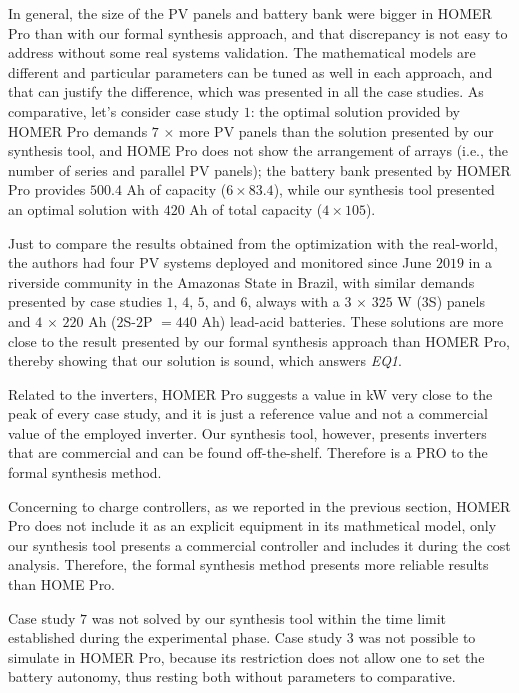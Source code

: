 \documentclass[review]{elsarticle}
\begin{document}
In general, the size of the PV panels and battery bank were 
bigger in HOMER Pro than with our formal synthesis approach, 
and that discrepancy is not easy to address without some real 
systems validation. The mathematical models are different and 
particular parameters can be tuned as well in each approach, 
and that can justify the difference, which was presented in all 
the case studies. As comparative, let's consider case study $1$: 
the optimal solution provided by HOMER Pro demands $7$ $\times$ 
more PV panels than the solution presented by our synthesis tool, 
and HOME Pro does not show the arrangement of arrays 
(i.e., the number of series and parallel PV panels); 
the battery bank presented by HOMER Pro provides $500.4$ Ah 
of capacity ($6 \times 83.4$), while our synthesis tool 
presented an optimal solution with $420$ Ah of total capacity 
($4 \times 105$). 

Just to compare the results obtained from the optimization 
with the real-world, the authors had four PV systems deployed 
and monitored since June $2019$ in a riverside community 
in the Amazonas State in Brazil, with similar demands 
presented by case studies $1$, $4$, $5$, and $6$, 
always with a $3$ $\times$ $325$ W ($3$S) panels and 
$4$ $\times$ $220$ Ah ($2$S-$2$P $= 440$ Ah) 
lead-acid batteries. These solutions are more close 
to the result presented by our formal synthesis 
approach than HOMER Pro, thereby showing that our 
solution is sound, which answers \textit{EQ1}.

Related to the inverters, HOMER Pro suggests a value in 
kW very close to the peak of every case study, and it 
is just a reference value and not a commercial value of 
the employed inverter. Our synthesis tool, however, 
presents inverters that are commercial and can be found 
off-the-shelf. Therefore is a PRO to the formal synthesis method.

Concerning to charge controllers, as we reported in 
the previous section, HOMER Pro does not include it 
as an explicit equipment in its mathmetical model, 
only our synthesis tool presents a commercial controller 
and includes it during the cost analysis. Therefore, 
the formal synthesis method presents more reliable results than
HOME Pro.

Case study $7$ was not solved by our synthesis tool 
within the time limit established during the experimental 
phase. Case study $3$ was not possible to simulate in HOMER Pro, 
because its restriction does not allow one to set the battery autonomy, 
thus resting both without parameters to comparative.
\end{document}
